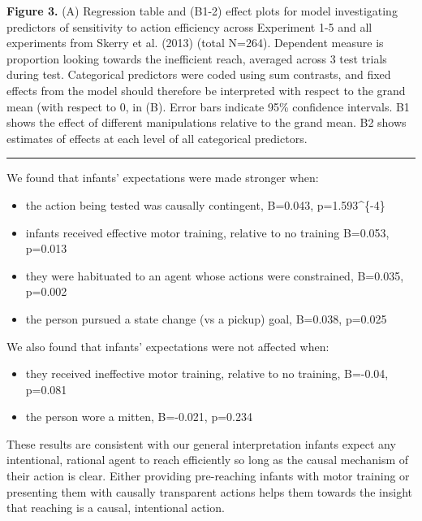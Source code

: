 \documentclass[]{article}
\providecommand{\tightlist}{%
  \setlength{\itemsep}{0pt}\setlength{\parskip}{0pt}}
\begin{document}
\textbf{Figure 3.} (A) Regression table and (B1-2) effect plots for
model investigating predictors of sensitivity to action efficiency
across Experiment 1-5 and all experiments from Skerry et al. (2013)
(total N=264). Dependent measure is proportion looking towards the
inefficient reach, averaged across 3 test trials during test.
Categorical predictors were coded using sum contrasts, and fixed effects
from the model should therefore be interpreted with respect to the grand
mean (with respect to 0, in (B). Error bars indicate 95\% confidence
intervals. B1 shows the effect of different manipulations relative to
the grand mean. B2 shows estimates of effects at each level of all
categorical predictors.

\begin{center}\rule{0.5\linewidth}{\linethickness}\end{center}

We found that infants' expectations were made stronger when:

\begin{itemize}
\tightlist
\item
  the action being tested was causally contingent, B=0.043,
  p=1.593\^{}\{-4\}
\item
  infants received effective motor training, relative to no training
  B=0.053, p=0.013
\item
  they were habituated to an agent whose actions were constrained,
  B=0.035, p=0.002
\item
  the person pursued a state change (vs a pickup) goal, B=0.038, p=0.025
\end{itemize}

We also found that infants' expectations were not affected when:

\begin{itemize}
\tightlist
\item
  they received ineffective motor training, relative to no training,
  B=-0.04, p=0.081
\item
  the person wore a mitten, B=-0.021, p=0.234
\end{itemize}

These results are consistent with our general interpretation infants
expect any intentional, rational agent to reach efficiently so long as
the causal mechanism of their action is clear. Either providing
pre-reaching infants with motor training or presenting them with
causally transparent actions helps them towards the insight that
reaching is a causal, intentional action.
\end{document}

